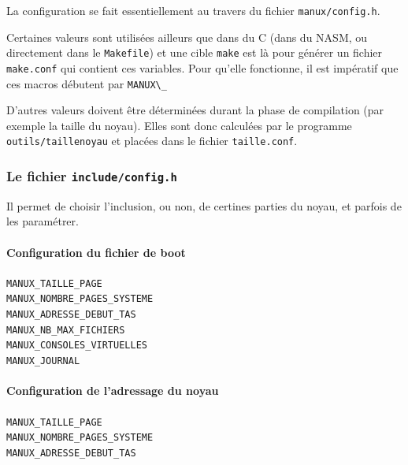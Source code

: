    La configuration se fait essentiellement au travers du fichier {\tt manux/config.h}.

   Certaines valeurs sont utilisées ailleurs que dans du C (dans du NASM,
ou directement dans le {\tt Makefile}) et une cible  {\tt make} est là
pour générer un fichier {\tt make.conf} qui contient ces
variables. Pour qu'elle fonctionne, il est impératif que ces macros
débutent par \lstinline!MANUX\_!

   D'autres valeurs doivent être déterminées durant la phase de
compilation (par exemple la taille du noyau). Elles sont donc
calculées par le programme {\tt outils/taillenoyau} et placées dans le
fichier {\tt taille.conf}.

%
\subsubsection{Le fichier {\tt include/config.h}}

   Il permet de choisir l'inclusion, ou non, de certines parties du
noyau, et parfois de les paramétrer.

%
%
%
\paragraph{Configuration du fichier de boot}

\begin{description}
   \item[{\tt MANUX\_TAILLE\_PAGE}]
   \item[{\tt MANUX\_NOMBRE\_PAGES\_SYSTEME}]
   \item[{\tt MANUX\_ADRESSE\_DEBUT\_TAS}]
   \item[{\tt MANUX\_NB\_MAX\_FICHIERS}]
   \item[{\tt MANUX\_CONSOLES\_VIRTUELLES}]
   \item[{\tt MANUX\_JOURNAL}]
\end{description}

%
%
%
\paragraph{Configuration de l'adressage du noyau}
\begin{description}
   \item[{\tt MANUX\_TAILLE\_PAGE}]
   \item[{\tt MANUX\_NOMBRE\_PAGES\_SYSTEME}]
   \item[{\tt MANUX\_ADRESSE\_DEBUT\_TAS}]
\end{description}

